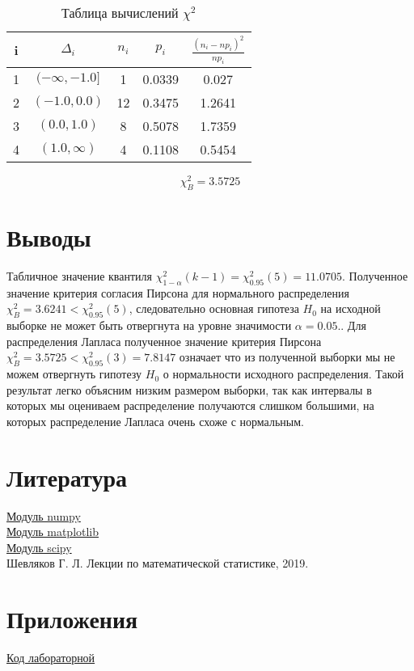 \documentclass[a4]{article}
\begin{document}
\begin{table}[H]
	\caption{Таблица вычислений $\chi^2$}
	\label{tab:my_label1}
	\begin{center}
		\vspace{5mm}
		\begin{tabular}{|c|c|c|c|c|}
			\hline
			i & $\Delta_i$ & $n_i$ & $p_i$ & $\frac{(n_i-np_i)^2}{np_i}$\\
			\hline
			1&	 $(-\infty, -1.0]$ &	1  &	 0.0339 &	 0.027\\
			\hline
			2&	$(-1.0, 0.0)$&	12&	 0.3475&	  1.2641\\
			\hline
			3& $(0.0, 1.0)$&	8&	 0.5078&	 1.7359\\
			\hline
			4&	$(1.0, \infty)$&	4&	 0.1108&	 0.5454\\
			\hline
			
			\hline
		\end{tabular}
	\end{center}
\end{table}

$$\chi_B^2 = 3.5725$$ 

\section{Выводы}

Табличное значение квантиля  $\chi^2_{1-\alpha}(k-1)=\chi^2_{0.95}(5) = 11.0705$.
Полученное значение критерия согласия Пирсона для нормального распределения $\chi_B^2 = 3.6241 < \chi^2_{0.95}(5)$, следовательно основная гипотеза $H_0$ на исходной выборке не может быть отвергнута на уровне значимости $\alpha = 0.05.$. Для распределения Лапласа полученное значение критерия Пирсона $\chi_B^2 = 3.5725 < \chi^2_{0.95}(3) = 7.8147$ означает что из полученной выборки мы не можем отвергнуть гипотезу $H_0$ о нормальности исходного распределения. Такой результат легко объясним низким размером выборки, так как интервалы в которых мы оцениваем распределение получаются слишком большими, на которых распределение Лапласа очень схоже с нормальным.


\section{Литература}

\href{https://physics.susu.ru/vorontsov/language/numpy.html}{Модуль numpy}\\

\href{https://matplotlib.org/}{Модуль matplotlib}\\

\href{https://www.scipy.org/}{Модуль scipy}\\

Шевляков Г. Л. Лекции по математической статистике, 2019.


\section{Приложения}

\href{https://github.com/dmitry-maltsov/PolyMatStat/blob/master/7/lab7.py}{Код лабораторной}
\end{document}
